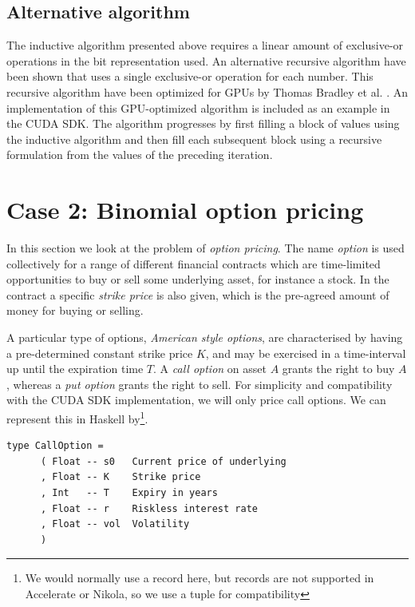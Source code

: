 \documentclass[preprint]{sigplanconf}
\begin{document}

\subsection{Alternative algorithm}
\label{sec:gpusobol}
The inductive algorithm presented above requires a linear amount of
exclusive-or operations in the bit representation used. An alternative
recursive algorithm have been shown that uses a single exclusive-or
operation for each number. This recursive algorithm have been
optimized for GPUs by Thomas Bradley et
al. \cite[Chapter~16]{hwy2011emerald}. An implementation of this
GPU-optimized algorithm is included as an example in the CUDA SDK. The
algorithm progresses by first filling a block of values using the
inductive algorithm and then fill each subsequent block using a
recursive formulation from the values of the preceding iteration.


\section{Case 2: Binomial option pricing}
In this section we look at the problem of \emph{option pricing}. The
name \emph{option} is used collectively for a range of different
financial contracts which are time-limited opportunities to buy or
sell some underlying asset, for instance a stock. In the contract a
specific \emph{strike price} is also given, which is the pre-agreed
amount of money for buying or selling.

A particular type of options, \emph{American style options}, are
characterised by having a pre-determined constant strike price $K$,
and may be exercised in a time-interval up until the expiration time
$T$. A \emph{call option} on asset $A$ grants the right to buy $A$,
whereas a \emph{put option} grants the right to sell. For simplicity
and compatibility with the CUDA SDK implementation, we will only price
call options. We can represent this in Haskell by\footnote{We would
  normally use a record here, but records are not supported in
  Accelerate or Nikola, so we use a tuple for compatibility}.

\begin{verbatim}
type CallOption =
      ( Float -- s0   Current price of underlying
      , Float -- K    Strike price               
      , Int   -- T    Expiry in years            
      , Float -- r    Riskless interest rate     
      , Float -- vol  Volatility
      )
\end{verbatim}
\end{document}
